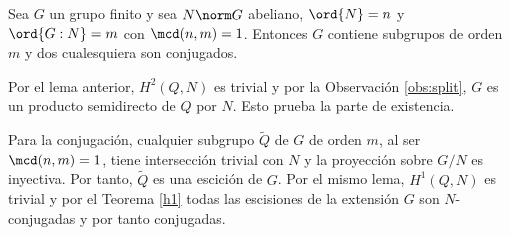 \begin{teorema}\label{thmschurab} Sea $G$ un grupo finito y sea $N \norm G$ abeliano, $\ord{N}=n$ y $\ord{G:N}=m$ con $\mcd(n,m)=1$. Entonces $G$ contiene subgrupos de orden $m$ y dos cualesquiera son conjugados.
	\begin{demostracion}
%		
%		

		Por el lema anterior, $H^2(Q,N)$ es trivial y por la Observación \ref{obs:split}, $G$ es un producto semidirecto de $Q$ por $N$. Esto prueba la parte de existencia.
		
		Para la conjugación, cualquier subgrupo $\tilde Q$ de $G$ de orden $m$, al ser $\mcd(n,m)=1$, tiene intersección trivial con $N$ y la proyección sobre $G/N$ es inyectiva. Por tanto, $\tilde Q$ es una escición de $G$. Por el mismo lema, $H^1(Q,N)$ es trivial y por el Teorema \ref{h1} todas las escisiones de la extensión $G$ son $N$-conjugadas y por tanto conjugadas. 
	\end{demostracion}
\end{teorema}